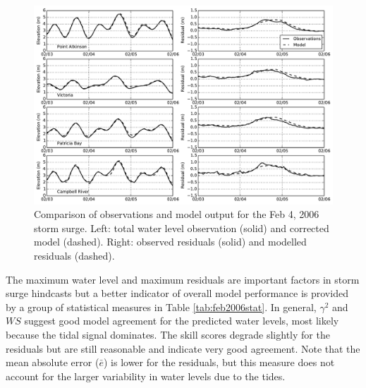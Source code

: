 \documentclass[pdftex,10pt]{article}
\begin{document}
\begin{figure}
\centering
\includegraphics[scale=0.6]{Figures/feb2006.pdf}
\caption{Comparison of observations and model output for the Feb 4, 2006 storm surge. Left: total water level observation (solid) and corrected model (dashed). Right: observed residuals (solid) and modelled residuals (dashed).}
\label{fig:feb2006}
\end{figure}

The maximum water level and maximum residuals are important factors in storm surge hindcasts but a better indicator of overall model performance is provided by a group of statistical measures in Table \ref{tab:feb2006stat}. In general, $\gamma^2$ and $WS$ suggest good model agreement for the predicted water levels, most likely because the tidal signal dominates. The skill scores degrade slightly for the residuals but are still reasonable and indicate very good agreement. Note that the mean absolute error ($\bar{e}$) is lower for the residuals, but this measure does not account for the larger variability in water levels due to the tides.
\end{document}

